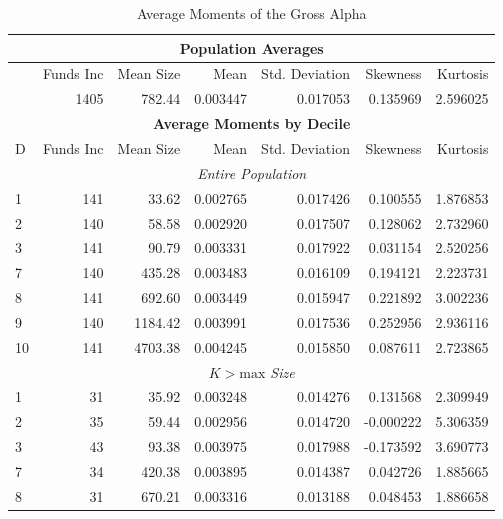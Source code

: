 \documentclass[12pt]{article}
\begin{document}
\begin{table}[h!]
    \centering
    \begin{threeparttable}
        \caption{Average Moments of the Gross Alpha}
        \label{tab:combined-moments}
        \begin{tabular}{lrrrrrr}
            \toprule
            \multicolumn{7}{c}{\textbf{Population Averages}} \\
            \midrule
            \multicolumn{1}{c}{} & Funds Inc & Mean Size & Mean & Std. Deviation & Skewness & Kurtosis \\
            \midrule
            & 1405 & 782.44 & 0.003447 & 0.017053 & 0.135969 & 2.596025 \\
            \midrule
            \multicolumn{7}{c}{\textbf{Average Moments by Decile}} \\
            \midrule
            D & Funds Inc & Mean Size & Mean & Std. Deviation & Skewness & Kurtosis \\
            \midrule
            \multicolumn{7}{c}{\textit{Entire Population}} \\
            \midrule
            1 & 141 & 33.62 & 0.002765 & 0.017426 & 0.100555 & 1.876853 \\
            2 & 140 & 58.58 & 0.002920 & 0.017507 & 0.128062 & 2.732960 \\
            3 & 141 & 90.79 & 0.003331 & 0.017922 & 0.031154 & 2.520256 \\
            7 & 140 & 435.28 & 0.003483 & 0.016109 & 0.194121 & 2.223731 \\
            8 & 141 & 692.60 & 0.003449 & 0.015947 & 0.221892 & 3.002236 \\
            9 & 140 & 1184.42 & 0.003991 & 0.017536 & 0.252956 & 2.936116 \\
            10 & 141 & 4703.38 & 0.004245 & 0.015850 & 0.087611 & 2.723865 \\
            \midrule
            \multicolumn{7}{c}{\textit{$K > \text{max}$ Size}} \\
            \midrule
            1 & 31 & 35.92 & 0.003248 & 0.014276 & 0.131568 & 2.309949 \\
            2 & 35 & 59.44 & 0.002956 & 0.014720 & -0.000222 & 5.306359 \\
            3 & 43 & 93.38 & 0.003975 & 0.017988 & -0.173592 & 3.690773 \\
            7 & 34 & 420.38 & 0.003895 & 0.014387 & 0.042726 & 1.885665 \\
            8 & 31 & 670.21 & 0.003316 & 0.013188 & 0.048453 & 1.886658 \\

\end{tabular}
\end{threeparttable}
\end{table}
\end{document}
